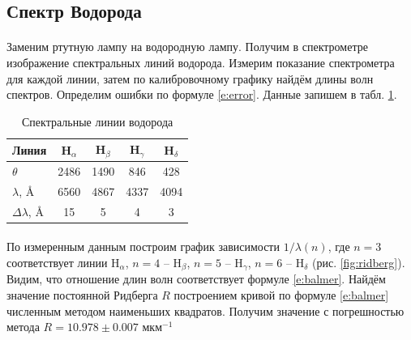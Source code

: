 \documentclass[a4paper,12pt]{article} %
\begin{document}
\subsection{Спектр Водорода}

\paragraph{} Заменим ртутную лампу на водородную лампу. Получим в спектрометре изображение спектральных линий водорода. Измерим показание спектрометра для каждой линии, затем по калибровочному графику найдём длины волн спектров. Определим ошибки по формуле \eqref{e:error}. Данные запишем в табл. \ref{tab:h_spectrum}.

\begin{table}[]
\centering
\begin{tabular}{|l|c|c|c|c|}
\hline
Линия               & H$_\alpha$ & H$_\beta$ & H$_\gamma$ & H$_\delta$ \\ \hline
$\theta$            & 2486       & 1490      & 846        & 428        \\ \hline
$\lambda$, Å        & 6560       & 4867      & 4337       & 4094       \\ \hline
$\Delta \lambda$, Å & 15         & 5         & 4          & 3          \\ \hline
\end{tabular}
\caption{Спектральные линии водорода}
\label{tab:h_spectrum}
\end{table}

\paragraph{} По измеренным данным построим график зависимости $1/\lambda(n)$, где $n=3$ соответствует линии H$_\alpha$, $n=4$ -- H$_\beta$, $n=5$ -- H$_\gamma$, $n=6$ -- H$_\delta$ (рис. \ref{fig:ridberg}). Видим, что отношение длин волн соответствует формуле \eqref{e:balmer}. Найдём значение постоянной Ридберга $R$ построением кривой по формуле  \eqref{e:balmer} численным методом наименьших квадратов. Получим значение с погрешностью метода $R = 10.978 \pm 0.007$ мкм$^{-1}$
\end{document}
